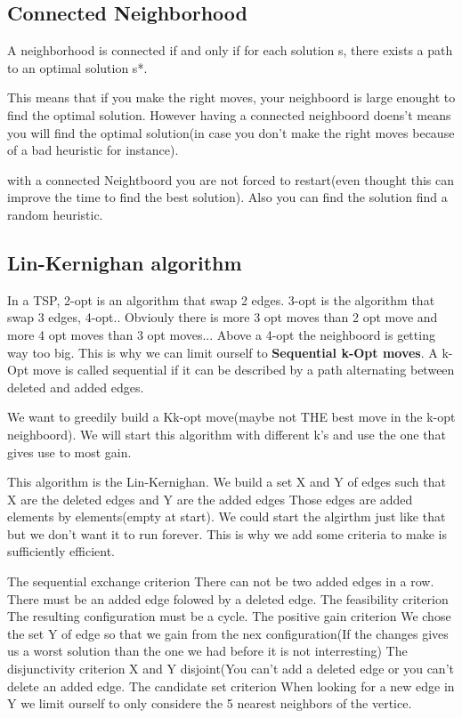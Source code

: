\subsection{Connected Neighborhood}
A neighborhood is connected if and only if for each
solution s, there exists a path to an optimal solution s*.

This means that if you make the right moves, your neighboord is large enought to find the optimal solution. However having a connected neighboord doens't means you will find the optimal solution(in case you don't make the right moves because of a bad heuristic for instance).\newline

with a connected Neightboord you are not forced to restart(even thought this can improve the time to find the best solution).
Also you can find the solution find a random heuristic.

\subsection{Lin-Kernighan algorithm}
In a TSP, 2-opt is an algorithm that swap 2 edges.
3-opt is the algorithm that swap 3 edges, 4-opt..
Obviouly there is more 3 opt moves than 2 opt move and more 4 opt moves than 3 opt moves...
Above a 4-opt the neighboord is getting way too big.
This is why we can limit ourself to \textbf{Sequential k-Opt moves}.
A k-Opt move is called sequential if it can be described
by a path alternating between deleted and added
edges.

We want to greedily build a Kk-opt move(maybe not THE best move in the k-opt neighboord).
We will start this algorithm with different k's and use the one that gives use to most gain.

This algorithm is the Lin-Kernighan.
We build a set X and Y of edges such that X are the deleted edges and Y are the added edges
Those edges are added elements by elements(empty at start).
We could start the algirthm just like that but we don't want it to run forever. This is why we add some criteria to make is sufficiently efficient.\newline

The sequential exchange criterion\newline
There can not be two added edges in a row. There must be an added edge folowed by a deleted edge.
The feasibility criterion\newline
The resulting configuration must be a cycle.
The positive gain criterion\newline
We chose the set Y of edge so that we gain from the nex configuration(If the changes gives us a worst solution than the one we had before it is not interresting)
The disjunctivity criterion\newline
X and Y disjoint(You can't add a deleted edge or you can't delete an added edge.
The candidate set criterion\newline
When looking for a new edge in Y we limit ourself to only considere the 5 nearest neighbors of the vertice.\newline

